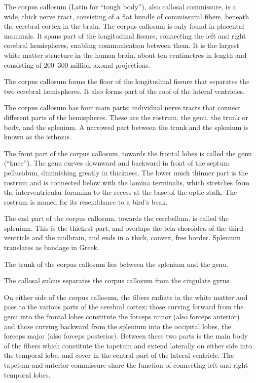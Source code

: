 \documentclass[]{book}
\begin{document}
The corpus callosum (Latin for ``tough body''), also callosal commissure, is a wide, thick nerve tract, consisting of a flat bundle of commissural fibers, beneath the cerebral cortex in the brain. The corpus callosum is only found in placental mammals. It spans part of the longitudinal fissure, connecting the left and right cerebral hemispheres, enabling communication between them. It is the largest white matter structure in the human brain, about ten centimetres in length and consisting of 200--300 million axonal projections.

The corpus callosum forms the floor of the longitudinal fissure that separates the two cerebral hemispheres. It also forms part of the roof of the lateral ventricles.

The corpus callosum has four main parts; individual nerve tracts that connect different parts of the hemispheres. These are the rostrum, the genu, the trunk or body, and the splenium. A narrowed part between the trunk and the splenium is known as the isthmus.

The front part of the corpus callosum, towards the frontal lobes is called the genu (``knee''). The genu curves downward and backward in front of the septum pellucidum, diminishing greatly in thickness. The lower much thinner part is the rostrum and is connected below with the lamina terminalis, which stretches from the interventricular foramina to the recess at the base of the optic stalk. The rostrum is named for its resemblance to a bird's beak.

The end part of the corpus callosum, towards the cerebellum, is called the splenium. This is the thickest part, and overlaps the tela choroidea of the third ventricle and the midbrain, and ends in a thick, convex, free border. Splenium translates as bandage in Greek.

The trunk of the corpus callosum lies between the splenium and the genu.

The callosal sulcus separates the corpus callosum from the cingulate gyrus.

On either side of the corpus callosum, the fibers radiate in the white matter and pass to the various parts of the cerebral cortex; those curving forward from the genu into the frontal lobes constitute the forceps minor (also forceps anterior) and those curving backward from the splenium into the occipital lobes, the forceps major (also forceps posterior). Between these two parts is the main body of the fibers which constitute the tapetum and extend laterally on either side into the temporal lobe, and cover in the central part of the lateral ventricle. The tapetum and anterior commissure share the function of connecting left and right temporal lobes.
\end{document}
